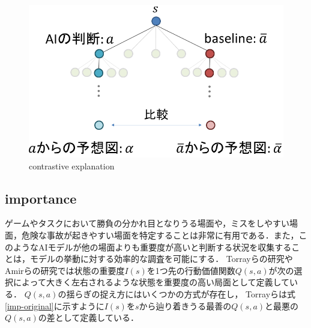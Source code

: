 \begin{figure}[htbp]
	\centering
	\includegraphics[width=\linewidth]{./figure/contrastive.png}
	\caption{contrastive explanation}
	\label{fig:contrastive}
\end{figure}
\subsection{importance}
ゲームやタスクにおいて勝負の分かれ目となりうる場面や，ミスをしやすい場面，危険な事故が起きやすい場面を特定することは非常に有用である．また，このようなAIモデルが他の場面よりも重要度が高いと判断する状況を収集することは，モデルの挙動に対する効率的な調査を可能にする．
Torrayらの研究\cite{imp2013}やAmirらの研究\cite{imp2016}では状態の重要度$I(s)$を1つ先の行動価値関数$Q(s, a)$が次の選択によって大きく左右されるような状態を重要度の高い局面として定義している．
$Q(s, a)$の揺らぎの捉え方にはいくつかの方式が存在し，
Torrayらは式\ref{imp-original}に示すように$I(s)$を$s$から辿り着きうる最善の$Q(s, a)$と最悪の$Q(s, a)$の差として定義している．

